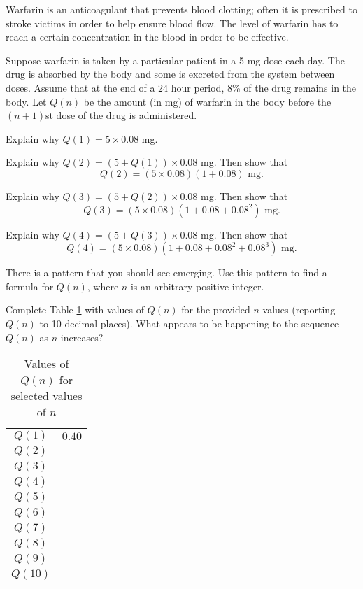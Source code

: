 \begin{activity} \label{A:7.2.1}  
  Warfarin is an anticoagulant that prevents blood clotting; often it is prescribed to stroke victims in order  to help ensure blood flow. The level of warfarin has to reach a certain concentration in the blood in order to be effective. 

Suppose warfarin is taken by a particular patient in a 5 mg dose each day. The drug is absorbed by the body and some is excreted from the system between doses. Assume that at the end of a 24 hour period, 8\% of the drug remains in the body. Let $Q(n)$ be the amount (in mg) of warfarin in the body before the $(n+1)$st dose of the drug is administered.

\ba
\item Explain why $Q(1) = 5 \times 0.08$ mg.

\item Explain why $Q(2) = (5+Q(1)) \times 0.08$ mg. Then show that 
\[Q(2) = (5 \times 0.08)\left(1+0.08\right) \text{ mg}.\]

\item Explain why $Q(3) = (5+Q(2)) \times 0.08$ mg. Then show that
\[Q(3) = (5 \times 0.08)\left(1+0.08+0.08^2\right) \text{ mg}.\]

\item Explain why $Q(4) = (5+Q(3)) \times 0.08$ mg. Then show that
\[Q(4) = (5 \times 0.08)\left(1+0.08+0.08^2+0.08^3\right) \text{ mg}.\]

\item There is a pattern that you should see emerging. Use this pattern to find a formula for $Q(n)$, where $n$ is an arbitrary positive integer.

\item Complete Table \ref{T:8.2_Warfarin} with values of $Q(n)$ for the provided $n$-values (reporting $Q(n)$ to 10 decimal places). What appears to be happening to the sequence $Q(n)$ as $n $ increases?
\begin{table}[ht]
\begin{center}
\renewcommand{\arraystretch}{1.5}
\begin{tabular}{c|c}
$Q(1)$   & $0.40$ \\
$Q(2)$   & \\
$Q(3)$   &  \\
$Q(4)$   &  \\
$Q(5)$   &  \\
$Q(6)$   &  \\
$Q(7)$   &  \\
$Q(8)$   &  \\
$Q(9)$   &  \\
$Q(10)$  &  \\
\end{tabular}
\caption{Values of $Q(n)$ for selected values of $n$}
\label{T:8.2_Warfarin}
\end{center}
\end{table}


\end{activity}
